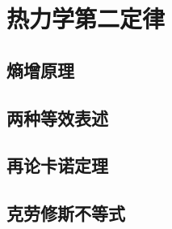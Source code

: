 

\section{热力学第二定律}\label{11-3}

\subsection{熵增原理}\label{11-3-1}

\subsection{两种等效表述}\label{11-3-2}

\subsection{再论卡诺定理}\label{11-3-3}

\subsection{克劳修斯不等式}\label{11-3-4}